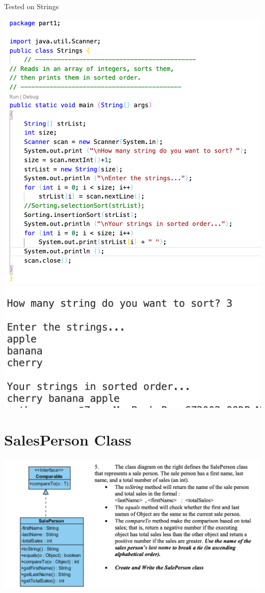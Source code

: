 \documentclass[hidelinks,12pt]{article}
\begin{document}
Tested on Strings

\includegraphics[scale=0.4]{newStrings.png}
\includegraphics[scale=0.55]{newStringR.png}

\newpage
\section{SalesPerson Class}
\includegraphics[scale=0.55]{q5.png} 
\end{document}
